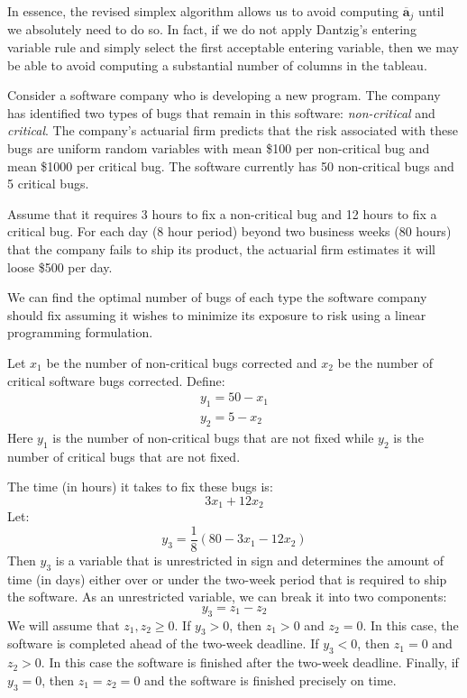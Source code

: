 In essence, the revised simplex algorithm allows us to avoid computing $\overline{\mathbf{a}}_j$ until we absolutely need to do so. In fact, if we do not apply Dantzig's entering variable rule and simply select the first acceptable entering variable, then we may be able to avoid computing a substantial number of columns in the tableau. 

\begin{example}
Consider a software company who is developing a new program. The company has identified two types of bugs that remain in this software: \textit{non-critical} and \textit{critical}. The company's actuarial firm predicts that the risk associated with these bugs are uniform random variables with mean \$100 per non-critical bug and mean \$1000 per critical bug. The software currently has 50 non-critical bugs and 5 critical bugs.

Assume that it requires 3 hours to fix a non-critical bug and 12 hours to fix a critical bug. For each day (8 hour period) beyond two business weeks (80 hours) that the company fails to ship its product, the actuarial firm estimates it will loose \$500 per day.

We can find the optimal number of bugs of each type the software company should fix assuming it wishes to minimize its exposure to risk using a linear programming formulation. 

Let $x_1$ be the number of non-critical bugs corrected and $x_2$ be the number of critical software bugs corrected. Define:
\begin{gather}
y_1 = 50 - x_1\\
y_2 = 5 - x_2
\end{gather}
Here $y_1$ is the number of non-critical bugs that are not fixed while $y_2$ is the number of critical bugs that are not fixed.

The time (in hours) it takes to fix these bugs is:
\begin{equation}
3x_1 + 12x_2
\end{equation}
Let:
\begin{equation}
y_3 = \frac{1}{8}\left(80 - 3x_1 - 12x_2\right)
\end{equation}
Then $y_3$ is a variable that is unrestricted in sign and determines the amount of time (in days) either over or under the two-week period that is required to ship the software. As an unrestricted variable, we can break it into two components:
\begin{equation}
y_3 = z_1 - z_2
\end{equation}
We will assume that $z_1, z_2 \geq 0$. If $y_3 > 0$, then $z_1 > 0$ and $z_2 = 0$. In this case, the software is completed ahead of the two-week deadline. If $y_3 < 0$, then $z_1 = 0$ and $z_2 > 0$. In this case the software is finished after the two-week deadline. Finally, if $y_3 = 0$, then $z_1 = z_2 = 0$ and the software is finished precisely on time. 


\end{example}
